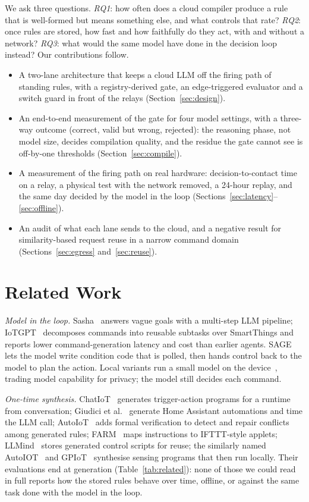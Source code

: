 \documentclass[conference]{IEEEtran}
\begin{document}
We ask three questions. \textit{RQ1}: how often does a cloud compiler produce
a rule that is well-formed but means something else, and what controls that
rate? \textit{RQ2}: once rules are stored, how fast and how faithfully do they
act, with and without a network? \textit{RQ3}: what would the same model have
done in the decision loop instead? Our contributions follow.
\begin{itemize}
\item A two-lane architecture that keeps a cloud LLM off the firing path of
standing rules, with a registry-derived gate, an edge-triggered evaluator and a
switch guard in front of the relays (Section~\ref{sec:design}).
\item An end-to-end measurement of the gate for four model settings, with a
three-way outcome (correct, valid but wrong, rejected): the reasoning phase,
not model size, decides compilation quality, and the residue the gate cannot
see is off-by-one thresholds (Section~\ref{sec:compile}).
\item A measurement of the firing path on real hardware: decision-to-contact
time on a relay, a physical test with the network removed, a 24-hour replay,
and the same day decided by the model in the loop
(Sections~\ref{sec:latency}--\ref{sec:offline}).
\item An audit of what each lane sends to the cloud, and a negative result for
similarity-based request reuse in a narrow command domain
(Sections~\ref{sec:egress} and~\ref{sec:reuse}).
\end{itemize}

\section{Related Work}\label{sec:related}

\textit{Model in the loop.} Sasha~\cite{sasha} answers vague goals with a
multi-step LLM pipeline; IoTGPT~\cite{iotgpt} decomposes commands into reusable
subtasks over SmartThings and reports lower command-generation latency and cost
than earlier agents. SAGE~\cite{sage} lets the model write condition code that
is polled, then hands control back to the model to plan the action. Local
variants run a small model on the device~\cite{birkmose,harmony,homellama,adahome},
trading model capability for privacy; the model still decides each command.

\textit{One-time synthesis.} ChatIoT~\cite{chatiot} generates trigger-action
programs for a runtime from conversation; Giudici et al.~\cite{giudici} generate
Home Assistant automations and time the LLM call; AutoIoT~\cite{autoiot} adds
formal verification to detect and repair conflicts among generated rules;
FARM~\cite{farm} maps instructions to IFTTT-style applets; LLMind~\cite{llmind}
stores generated control scripts for reuse; the similarly named
AutoIOT~\cite{autoiot_nl} and GPIoT~\cite{gpiot} synthesise sensing programs
that then run locally. Their evaluations end at generation
(Table~\ref{tab:related}): none of those we could read in full reports how the
stored rules behave over time, offline, or against the same task done with the
model in the loop.
\end{document}
